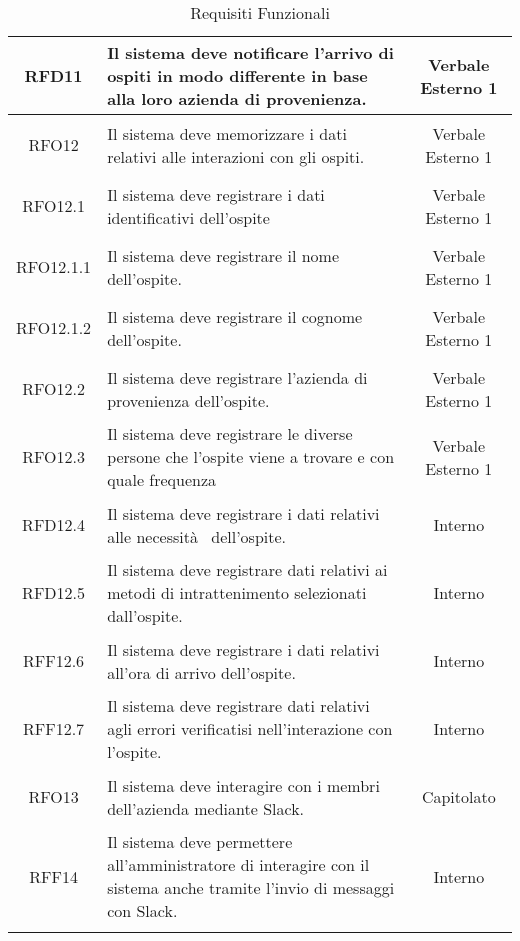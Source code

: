 \begin{longtable}{|c|>{\centering}m{7cm}|c|}
\hypertarget{RFD11}{RFD11} & Il sistema deve notificare l'arrivo di ospiti in modo differente in base alla loro azienda di provenienza. & Verbale Esterno 1\\ \hline
\hypertarget{RFO12}{RFO12} & Il sistema deve memorizzare i dati relativi alle interazioni con gli ospiti. & Verbale Esterno 1\\ \hline
\hypertarget{RFO12.1}{RFO12.1} & Il sistema deve registrare i dati identificativi dell'ospite & Verbale Esterno 1\\ \hline
\hypertarget{RFO12.1.1}{RFO12.1.1} & Il sistema deve registrare il nome dell'ospite. & Verbale Esterno 1\\ \hline
\hypertarget{RFO12.1.2}{RFO12.1.2} & Il sistema deve registrare il cognome dell'ospite. & Verbale Esterno 1\\ \hline
\hypertarget{RFO12.2}{RFO12.2} & Il sistema deve registrare l'azienda di provenienza dell'ospite. & Verbale Esterno 1\\ \hline
\hypertarget{RFO12.3}{RFO12.3} & Il sistema deve registrare le diverse persone che l'ospite viene a trovare e con quale frequenza & Verbale Esterno 1\\ \hline
\hypertarget{RFD12.4}{RFD12.4} & Il sistema deve registrare i dati relativi alle necessità  dell'ospite. & Interno\\ \hline
\hypertarget{RFD12.5}{RFD12.5} & Il sistema deve registrare dati relativi ai metodi di intrattenimento selezionati dall'ospite. & Interno\\ \hline
\hypertarget{RFF12.6}{RFF12.6} & Il sistema deve registrare i dati relativi all'ora di arrivo dell'ospite. & Interno\\ \hline
\hypertarget{RFF12.7}{RFF12.7} & Il sistema deve registrare dati relativi agli errori verificatisi nell'interazione con l'ospite. & Interno\\ \hline
\hypertarget{RFO13}{RFO13} & Il sistema deve interagire con i membri dell'azienda mediante Slack. & Capitolato\\ \hline
\hypertarget{RFF14}{RFF14} & Il sistema deve permettere all'amministratore di interagire con il sistema anche tramite l'invio di messaggi con Slack. & Interno\\ \hline

\caption[Requisiti Funzionali]{Requisiti Funzionali}
\label{tabella:req0}
\end{longtable}
\clearpage
